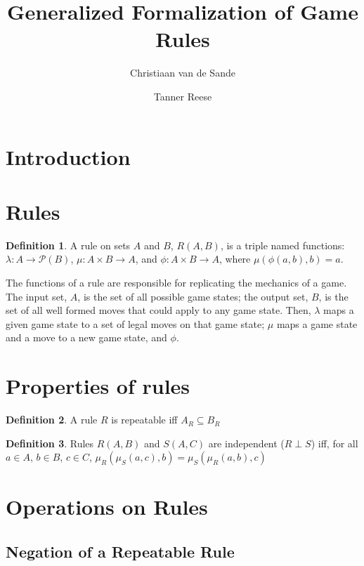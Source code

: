 \documentclass{article}
\title{Generalized Formalization of Game Rules}
\author{Christiaan van de Sande \and Tanner Reese}
\theoremstyle{definition}
\newtheorem{define}{Definition}[section]
\theoremstyle{plain}
\begin{document}
\maketitle

\section{Introduction}

\section{Rules}

\begin{define}
A rule on sets $A$ and $B$, $ R (A, B) $, is a triple named functions:
$ \lambda : A \rightarrow \mathcal{P} (B) $,
$ \mu : A \times B \rightarrow A $, 
and $ \phi : A \times B \rightarrow A $,
where $ \mu (\phi (a, b), b) = a $.
\end{define}

The functions of a rule are responsible for replicating the mechanics of a game.
The input set, $A$, is the set of all possible game states; the output set, $B$, is the set of all well formed moves that could apply to any game state.
Then, $\lambda$ maps a given game state to a set of legal moves on that game state;
$\mu$ maps a game state and a move to a new game state, and $\phi$.

\section{Properties of rules}

\begin{define}
A rule $R$ is repeatable iff $ A_R \subseteq B_R $
\end{define}

\begin{define}
Rules $ R (A, B) $ and $ S (A, C) $ are independent ($ R \perp S $) iff,
for all $ a \in A $, $ b \in B $, $ c \in C $,
$ \mu_R (\mu_S (a, c), b) = \mu_S (\mu_R (a, b), c) $\\ 
\end{define}

\section{Operations on Rules}

\subsection{Negation of a Repeatable Rule}
\end{document}
